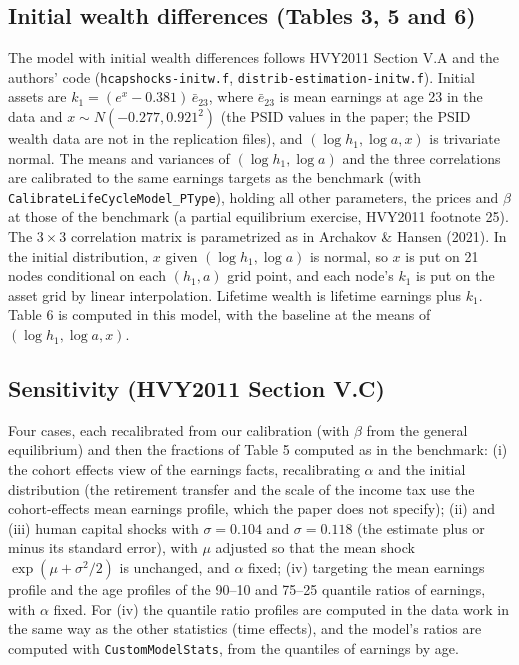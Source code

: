 \documentclass[11pt,fleqn]{article}
\begin{document}
\subsection{Initial wealth differences (Tables 3, 5 and 6)}

The model with initial wealth differences follows HVY2011 Section V.A and the authors' code (\verb|hcapshocks-initw.f|, \verb|distrib-estimation-initw.f|). Initial assets are $k_1=(e^x-0.381)\,\bar{e}_{23}$, where $\bar{e}_{23}$ is mean earnings at age 23 in the data and $x\sim N(-0.277,0.921^2)$ (the PSID values in the paper; the PSID wealth data are not in the replication files), and $(\log h_1,\log a,x)$ is trivariate normal. The means and variances of $(\log h_1,\log a)$ and the three correlations are calibrated to the same earnings targets as the benchmark (with \verb|CalibrateLifeCycleModel_PType|), holding all other parameters, the prices and $\beta$ at those of the benchmark (a partial equilibrium exercise, HVY2011 footnote 25). The $3\times3$ correlation matrix is parametrized as in Archakov \& Hansen (2021). In the initial distribution, $x$ given $(\log h_1,\log a)$ is normal, so $x$ is put on 21 nodes conditional on each $(h_1,a)$ grid point, and each node's $k_1$ is put on the asset grid by linear interpolation. Lifetime wealth is lifetime earnings plus $k_1$. Table 6 is computed in this model, with the baseline at the means of $(\log h_1,\log a,x)$.

\subsection{Sensitivity (HVY2011 Section V.C)}

Four cases, each recalibrated from our calibration (with $\beta$ from the general equilibrium) and then the fractions of Table 5 computed as in the benchmark: (i) the cohort effects view of the earnings facts, recalibrating $\alpha$ and the initial distribution (the retirement transfer and the scale of the income tax use the cohort-effects mean earnings profile, which the paper does not specify); (ii) and (iii) human capital shocks with $\sigma=0.104$ and $\sigma=0.118$ (the estimate plus or minus its standard error), with $\mu$ adjusted so that the mean shock $\exp(\mu+\sigma^2/2)$ is unchanged, and $\alpha$ fixed; (iv) targeting the mean earnings profile and the age profiles of the 90--10 and 75--25 quantile ratios of earnings, with $\alpha$ fixed. For (iv) the quantile ratio profiles are computed in the data work in the same way as the other statistics (time effects), and the model's ratios are computed with \verb|CustomModelStats|, from the quantiles of earnings by age.
\end{document}
